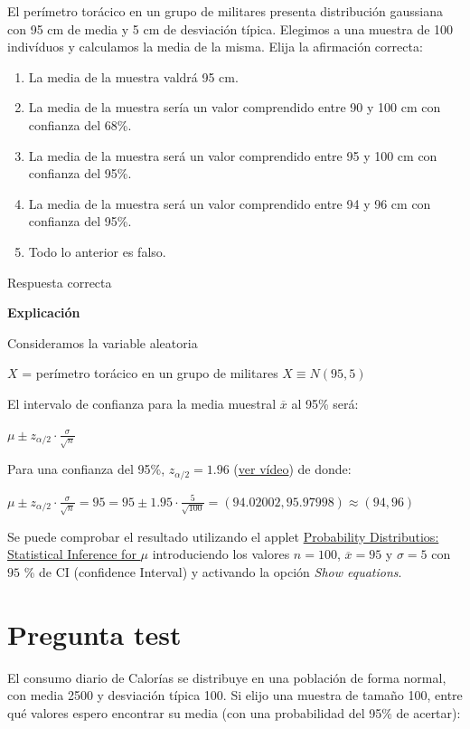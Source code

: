 \documentclass[
]{book}
\providecommand{\tightlist}{%
  \setlength{\itemsep}{0pt}\setlength{\parskip}{0pt}}
\begin{document}
El perímetro torácico en un grupo de militares presenta distribución gaussiana con 95 cm de media y 5 cm de desviación típica. Elegimos a una muestra de 100 indivíduos y calculamos la media de la misma. Elija la afirmación correcta:

\begin{enumerate}
\def\labelenumi{\alph{enumi})}
\tightlist
\item
  La media de la muestra valdrá 95 cm.
\item
  La media de la muestra sería un valor comprendido entre 90 y 100 cm con confianza del 68\%.
\item
  La media de la muestra será un valor comprendido entre 95 y 100 cm con confianza del 95\%.
\item
  La media de la muestra será un valor comprendido entre 94 y 96 cm con confianza del 95\%.
\item
  Todo lo anterior es falso.
\end{enumerate}

Respuesta correcta

\textbf{Explicación}

Consideramos la variable aleatoria

\(X\) = perímetro torácico en un grupo de militares \(X \equiv N(95, 5)\)

El intervalo de confianza para la media muestral \(\overline{x}\) al 95\% será:

\(\mu \pm z_{\alpha/2} \cdot \frac{\sigma}{\sqrt{n}}\)

Para una confianza del 95\%, \(z_{\alpha/2} = 1.96\) (\href{https://youtu.be/wWeogWp_bO8}{ver vídeo}) de donde:

\(\mu \pm z_{\alpha/2} \cdot \frac{\sigma}{\sqrt{n}}= 95 = 95 \pm 1.95 \cdot \frac{5}{\sqrt{100}}= (94.02002,95.97998) \approx (94, 96)\)

Se puede comprobar el resultado utilizando el applet \href{https://homepage.divms.uiowa.edu/~mbognar/applets/mu.raw.html}{Probability Distributios: Statistical Inference for \(\mu\)} introduciendo los valores \(n=100\), \(\overline{x}=95\) y \(\sigma = 5\) con \(95\) \% de CI (confidence Interval) y activando la opción \emph{Show equations}.

\hypertarget{pregunta-test-100}{%
\section{Pregunta test}\label{pregunta-test-100}}

El consumo diario de Calorías se distribuye en una población de forma normal, con media 2500 y desviación típica 100. Si elijo una muestra de tamaño 100, entre qué valores espero encontrar su media (con una probabilidad del 95\% de acertar):
\end{document}
